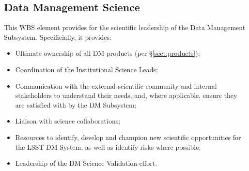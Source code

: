 \subsection{Data Management Science}

This WBS element provides for the scientific leadership of the Data Management
Subsystem. Specificially, it provides:

\begin{itemize}

  \item{Ultimate ownership of all DM products (per \S\ref{sect:products});}

  \item{Coordination of the Institutional Science Leads;}

  \item{Communication with the external scientific community and internal
  stakeholders to understand their needs, and, where applicable, ensure they
  are satisfied with by the DM Subsystem;}

  \item{Liaison with science collaborations;}

  \item{Resources to identify, develop and champion new scientific
  opportunities for the LSST DM System, as well as identify risks where
  possible;}

  \item{Leadership of the DM Science Validation effort.}

\end{itemize}
